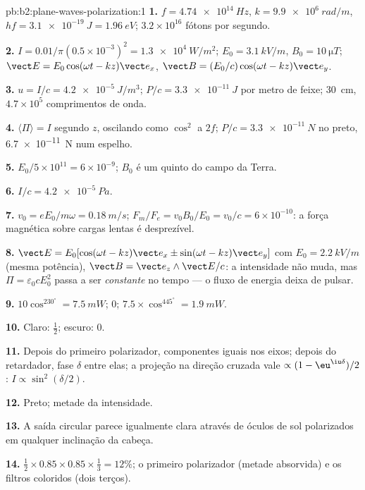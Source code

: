 \begin{solution}{pb:b2:plane-waves-polarization:1}
\textbf{1.} $f = \qty{4.74e14}{Hz}$, $k = \qty{9.9e6}{rad/m}$, $hf = \qty{3.1e-19}{J} =
\qty{1.96}{eV}$; $3.2 \times 10^{16}$ fótons por segundo.

\textbf{2.} $I = 0.01/\pi(0.5 \times 10^{-3})^2 = \qty{1.3e4}{W/m^2}$; $E_0 = \qty{3.1}{kV/m}$,
$B_0 = \qty{10}{\micro T}$; $\vect E = E_0\cos(\omega t - kz)\vect e_x$, $\vect B = (E_0/c)\cos(\omega t
- kz)\vect e_y$.

\textbf{3.} $u = I/c = \qty{4.2e-5}{J/m^3}$; $P/c = \qty{3.3e-11}{J}$ por metro de
feixe; \qty{30}{cm}, $4.7 \times 10^5$ comprimentos de onda.

\textbf{4.} $\langle\Pi\rangle = I$ segundo $z$, oscilando como $\cos^2$ a $2f$;
$P/c = \qty{3.3e-11}{N}$ no preto, \qty{6.7e-11}{N} num espelho.

\textbf{5.} $E_0/5 \times 10^{11} = 6 \times 10^{-9}$; $B_0$ é um quinto do campo
da Terra.

\textbf{6.} $I/c = \qty{4.2e-5}{Pa}$.

\textbf{7.} $v_0 = eE_0/m\omega = \qty{0.18}{m/s}$; $F_m/F_e = v_0B_0/E_0 = v_0/c = 6 \times
10^{-10}$: a força magnética sobre cargas lentas é desprezível.

\textbf{8.} $\vect E = E_0[\cos(\omega t - kz)\vect e_x \pm \sin(\omega t - kz)\vect e_y]$ com
$E_0 = \qty{2.2}{kV/m}$ (mesma potência), $\vect B = \vect e_z\wedge\vect E/c$: a
intensidade não muda, mas $\Pi = \varepsilon_0cE_0^2$ passa a ser \emph{constante} no
tempo --- o fluxo de energia deixa de pulsar.

\textbf{9.} $10\cos^230^\circ = \qty{7.5}{mW}$; $0$; $7.5 \times \cos^445^\circ = \qty{1.9}{mW}$.

\textbf{10.} Claro: $\tfrac12$; escuro: $0$.

\textbf{11.} Depois do primeiro polarizador, componentes iguais nos eixos;
depois do retardador, fase $\delta$ entre elas; a projeção na direção
cruzada vale $\propto(1 - \eu^{\iu\delta})/2$: $I \propto \sin^2(\delta/2)$.

\textbf{12.} Preto; metade da intensidade.

\textbf{13.} A saída circular parece igualmente clara através de óculos de sol
polarizados em qualquer inclinação da cabeça.

\textbf{14.} $\tfrac12 \times 0.85 \times 0.85 \times \tfrac13 = 12\%$; o primeiro polarizador
(metade absorvida) e os filtros coloridos (dois terços).


\end{solution}
